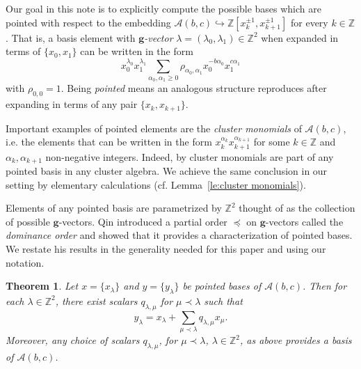 \documentclass{amsart}
\newtheorem{theorem}{Theorem}
\numberwithin{theorem}{section}
\newcommand{\bfg}{\boldsymbol{g}}
\newcommand{\cA}{\mathcal{A}}
\newcommand{\ZZ}{\mathbb{Z}}
\newcommand{\into}{\hookrightarrow}
\begin{document}
  Our goal in this note is to explicitly compute the possible bases which are pointed with respect to the embedding $\cA(b,c)\into\ZZ[x_k^{\pm1},x_{k+1}^{\pm1}]$ for every $k\in\ZZ$.
  That is, a basis element with \emph{$\bfg$-vector} $\lambda=(\lambda_0,\lambda_1)\in\ZZ^2$ when expanded in terms of $\{x_0,x_1\}$ can be written in the form
  \begin{equation}
    \label{eq:pointed}
    x_0^{\lambda_0}x_1^{\lambda_1}\sum\limits_{\alpha_0,\alpha_1 \ge 0} \rho_{\alpha_0,\alpha_1} x_0^{-b\alpha_0} x_1^{c\alpha_1}
  \end{equation}
  with $\rho_{0,0}=1$.
  Being \emph{pointed} means an analogous structure reproduces after expanding in terms of any pair $\{x_k,x_{k+1}\}$.

  Important examples of pointed elements are the \emph{cluster monomials} of $\cA(b,c)$, i.e. the elements that can be written in the form $x_k^{\alpha_k}x_{k+1}^{\alpha_{k+1}}$ for some $k\in\ZZ$ and $\alpha_k,\alpha_{k+1}$ non-negative integers.
  Indeed, by \cite[Lemma 3.4.12]{qin} cluster monomials are part of any pointed basis in any cluster algebra.
  We achieve the same conclusion in our setting by elementary calculations (cf. Lemma~\ref{le:cluster monomials}).

  Elements of any pointed basis are parametrized by $\ZZ^2$ thought of as the collection of possible $\bfg$-vectors.
  Qin introduced a partial order $\preceq$ on $\bfg$-vectors called the \emph{dominance order} and showed that it provides a characterization of pointed bases.
  We restate his results in the generality needed for this paper and using our notation.
  \begin{theorem}
    \label{th:dominance}
    \cite[Theorem 1.2.1]{qin}
    Let $x=\{x_\lambda\}$ and $y=\{y_\lambda\}$ be pointed bases of $\cA(b,c)$.
    Then for each $\lambda\in\ZZ^2$, there exist scalars $q_{\lambda,\mu}$ for $\mu\prec\lambda$ such that
    \[y_\lambda=x_\lambda+\sum_{\mu\prec\lambda} q_{\lambda,\mu} x_\mu.\]
    Moreover, any choice of scalars $q_{\lambda,\mu}$, for $\mu\prec\lambda$, $\lambda\in\ZZ^2$, as above provides a basis of $\cA(b,c)$.
  \end{theorem}
\end{document}
